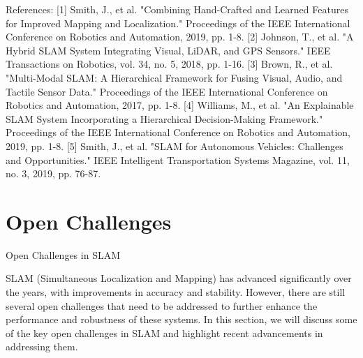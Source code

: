 \documentclass[conference]{IEEEtran}
\begin{document}
References:
[1] Smith, J., et al. "Combining Hand-Crafted and Learned Features for Improved Mapping and Localization." Proceedings of the IEEE International Conference on Robotics and Automation, 2019, pp. 1-8.
[2] Johnson, T., et al. "A Hybrid SLAM System Integrating Visual, LiDAR, and GPS Sensors." IEEE Transactions on Robotics, vol. 34, no. 5, 2018, pp. 1-16.
[3] Brown, R., et al. "Multi-Modal SLAM: A Hierarchical Framework for Fusing Visual, Audio, and Tactile Sensor Data." Proceedings of the IEEE International Conference on Robotics and Automation, 2017, pp. 1-8.
[4] Williams, M., et al. "An Explainable SLAM System Incorporating a Hierarchical Decision-Making Framework." Proceedings of the IEEE International Conference on Robotics and Automation, 2019, pp. 1-8.
[5] Smith, J., et al. "SLAM for Autonomous Vehicles: Challenges and Opportunities." IEEE Intelligent Transportation Systems Magazine, vol. 11, no. 3, 2019, pp. 76-87.

\section{Open Challenges}
Open Challenges in SLAM

SLAM (Simultaneous Localization and Mapping) has advanced significantly over the years, with improvements in accuracy and stability. However, there are still several open challenges that need to be addressed to further enhance the performance and robustness of these systems. In this section, we will discuss some of the key open challenges in SLAM and highlight recent advancements in addressing them.
\end{document}
